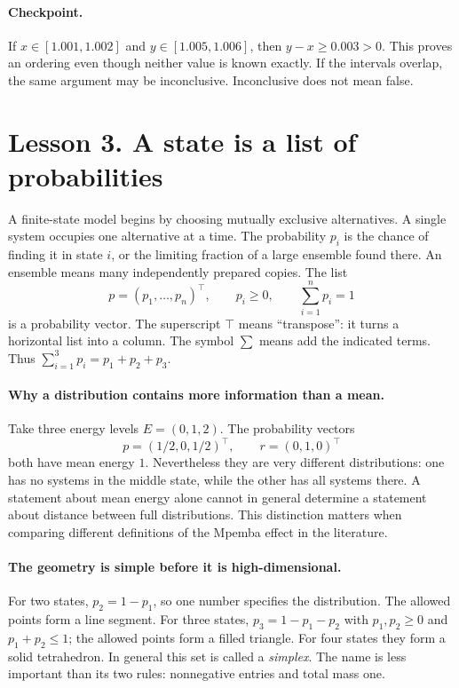 \paragraph{Checkpoint.}
If $x\in[1.001,1.002]$ and $y\in[1.005,1.006]$, then $y-x\geq0.003>0$.
This proves an ordering even though neither value is known exactly. If the
intervals overlap, the same argument may be inconclusive. Inconclusive does
not mean false.

\clearpage
\section*{Lesson 3. A state is a list of probabilities}
A finite-state model begins by choosing mutually exclusive alternatives. A
single system occupies one alternative at a time. The probability $p_i$ is the
chance of finding it in state $i$, or the limiting fraction of a large ensemble
found there. An ensemble means many independently prepared copies. The list
\[
p=(p_1,\ldots,p_n)^\top,\qquad p_i\geq0,
\qquad\sum_{i=1}^n p_i=1
\]
is a probability vector. The superscript $\top$ means ``transpose'': it turns a
horizontal list into a column. The symbol $\sum$ means add the indicated terms.
Thus $\sum_{i=1}^3p_i=p_1+p_2+p_3$.

\paragraph{Why a distribution contains more information than a mean.}
Take three energy levels $E=(0,1,2)$. The probability vectors
\[
p=(1/2,0,1/2)^\top,\qquad r=(0,1,0)^\top
\]
both have mean energy $1$. Nevertheless they are very different distributions:
one has no systems in the middle state, while the other has all systems there.
A statement about mean energy alone cannot in general determine a statement
about distance between full distributions. This distinction matters when
comparing different definitions of the Mpemba effect in the literature.

\paragraph{The geometry is simple before it is high-dimensional.}
For two states, $p_2=1-p_1$, so one number specifies the distribution. The
allowed points form a line segment. For three states, $p_3=1-p_1-p_2$ with
$p_1,p_2\geq0$ and $p_1+p_2\leq1$; the allowed points form a filled triangle.
For four states they form a solid tetrahedron. In general this set is called a
\emph{simplex}. The name is less important than its two rules: nonnegative
entries and total mass one.

